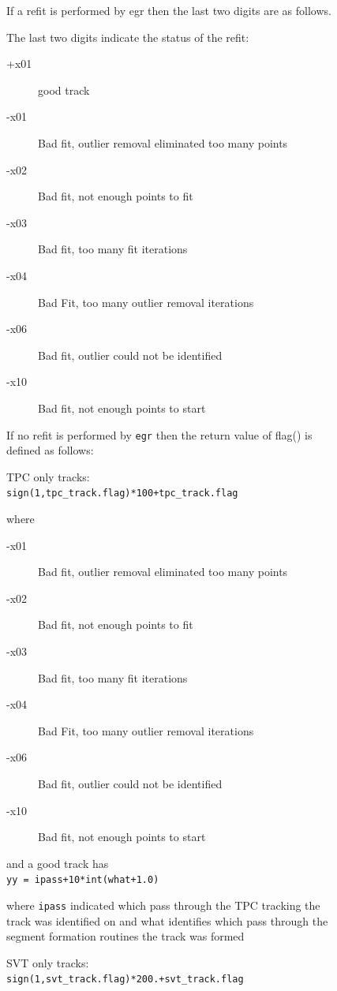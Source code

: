 \documentclass[twoside]{article}
\begin{document}
\begin{figure}[htb]
\begin{center}
    If a refit is performed by egr then the last two digits are as follows.

    The last two digits indicate the status of the refit:
    \begin{description}
    \item[+x01] good track 
    \item[-x01] Bad fit, outlier removal eliminated too many points 
    \item[-x02] Bad fit, not enough points to fit 
    \item[-x03] Bad fit, too many fit iterations 
    \item[-x04] Bad Fit, too many outlier removal iterations 
    \item[-x06] Bad fit, outlier could not be identified 
    \item[-x10] Bad fit, not enough points to start 
    \end{description} 

    If no refit is performed by \texttt{egr} then the return value of flag()
    is defined as follows: 

    TPC only tracks:\\
    \texttt{sign(1,tpc\_track.flag)*100+tpc\_track.flag}

    where 
  
    \begin{description}
    \item[-x01] Bad fit, outlier removal eliminated too many points 
    \item[-x02] Bad fit, not enough points to fit 
    \item[-x03] Bad fit, too many fit iterations 
    \item[-x04] Bad Fit, too many outlier removal iterations 
    \item[-x06] Bad fit, outlier could not be identified 
    \item[-x10] Bad fit, not enough points to start 
    \end{description} 

       and a good track has\\ 
           \texttt{yy = ipass+10*int(what+1.0) }

     where \texttt{ipass} indicated which pass through the TPC tracking the track
     was identified on and what identifies which pass through the segment formation
     routines the track was formed   

     SVT only tracks:\\ 
     \texttt{sign(1,svt\_track.flag)*200.+svt\_track.flag}


\end{center}
\end{figure}
\end{document}
